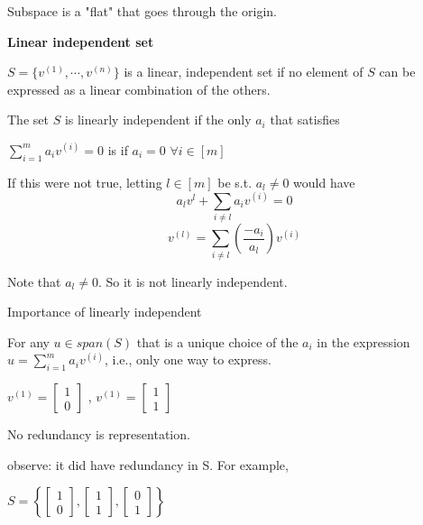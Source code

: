 Subspace is a "flat" that goes through the origin.

\vspace{0.5cm}
\noindent\textbf{Linear independent set}

$S=\{v^{(1)},\cdots , v^{(n)}\}$ is a linear, independent set if no element of $S$ can be expressed as a linear combination of the others.

The set $S$ is linearly independent if the only $a_{i}$ that satisfies

$\sum_{i=1}^{m}a_{i}v^{(i)}=0$ is if $a_{i}=0$ $\forall i\in [m]$

If this were not true, letting $l\in[m]$ be s.t. $a_{l}\neq 0$ would have
$$a_{l}v^{l}+\sum_{i\neq l} a_{i}v^{(i)}=0$$
$$v^{(l)}=\sum_{i\neq l}(\frac{-a_{i}}{a_{l}})v^{(i)}$$

Note that $a_{l}\neq 0$. So it is not linearly independent.

\vspace{0.5cm}
\noindent Importance of linearly independent

For any $u\in span(S)$ that is a unique choice of the $a_{i}$ in the expression
$u=\sum_{i=1}^{m} a_{i}v^{(i)}$, i.e., only one way to express.

\begin{marginfigure}
	\centering
	\resizebox{7.5cm}{3cm}{}
	\caption{}
	\label{fig.2-4}
\end{marginfigure}
\begin{marginfigure}
	\centering
	\resizebox{7.5cm}{3cm}{}
	\caption{}
	\label{fig.2-4}
\end{marginfigure}

$v^{(1)}= 
\left[ 
\begin{array}{c} 
1 \\
0
\end{array}
\right]$
,
$v^{(1)}= 
\left[ 
\begin{array}{c} 
1 \\
1
\end{array}
\right]$

No redundancy is representation.

observe: it did have redundancy in S. For example,

$S=\left\{\left[ 
\begin{array}{c} 
1\\
0
\end{array}
\right],           
\left[ 
\begin{array}{c} 
1\\
1
\end{array}
\right],
\left[ 
\begin{array}{c} 
0\\
1
\end{array}
\right]
\right\}$

